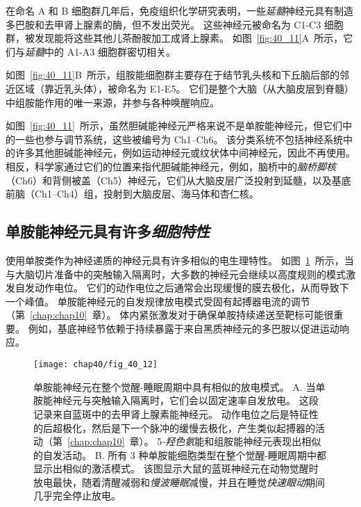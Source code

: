 在命名 A 和 B 细胞群几年后，免疫组织化学研究表明，一些\textit{延髓}神经元具有制造多巴胺和去甲肾上腺素的酶，但不发出荧光。
这些神经元被命名为 C1-C3 细胞群，被发现能将这些其他儿茶酚胺加工成肾上腺素。
如图~\ref{fig:40_11}A~所示，它们与\textit{延髓}中的 A1-A3 细胞群密切相关。


如图~\ref{fig:40_11}B~所示，组胺能细胞群主要存在于结节乳头核和下丘脑后部的邻近区域（靠近乳头体），被命名为 E1-E5。
它们是整个大脑（从大脑皮层到脊髓）中组胺能作用的唯一来源，并参与各种唤醒响应。


如图~\ref{fig:40_11}~所示，虽然胆碱能神经元严格来说不是单胺能神经元，但它们中的一些也参与调节系统，这些被编号为 Ch1–Ch6。
该分类系统不包括神经系统中的许多其他胆碱能神经元，例如运动神经元或纹状体中间神经元，因此不再使用。
相反，科学家通过它们的位置来指代胆碱能神经元，例如，脑桥中的\textit{脑桥脚核}（Ch6）和背侧被盖（Ch5）神经元，它们从大脑皮层广泛投射到延髓，以及基底前脑（Ch1–Ch4）组，投射到大脑皮层、海马体和杏仁核。



\subsection{单胺能神经元具有许多\textit{细胞特性}}

使用单胺类作为神经递质的神经元具有许多相似的电生理特性。
如图~\ref{fig:40_12}~所示，当与大脑切片准备中的突触输入隔离时，大多数的神经元会继续以高度规则的模式激发自发动作电位。
它们的动作电位之后通常会出现缓慢的膜去极化，从而导致下一个峰值。
单胺能神经元的自发规律放电模式受固有起搏器电流的调节（第~\ref{chap:chap10}~章）。
体内紧张激发对于确保单胺持续递送至靶标可能很重要。
例如，基底神经节依赖于持续暴露于来自黑质神经元的多巴胺以促进运动响应。


\begin{figure}[htbp]
	\centering
	\texttt{[image: chap40/fig\_40\_12]}
	\caption{单胺能神经元在整个觉醒-睡眠周期中具有相似的放电模式。
		A. 当单胺能神经元与突触输入隔离时，它们会以固定速率自发放电。
		这段记录来自蓝斑中的去甲肾上腺素能神经元。
		动作电位之后是特征性的后超极化，然后是下一个脉冲的缓慢去极化，产生类似起搏器的活动（第~\ref{chap:chap10}~章）。
		5\textit{-羟色氨}能和组胺能神经元表现出相似的自发活动。
		B. 所有 3 种单胺能细胞类型在整个觉醒-睡眠周期中都显示出相似的激活模式。
		该图显示大鼠的蓝斑神经元在动物觉醒时放电最快，随着清醒减弱和\textit{慢波睡眠}减慢，并且在睡觉\textit{快速眼动}期间几乎完全停止放电\cite{aston1981activity}。}
	\label{fig:40_12}
\end{figure}


